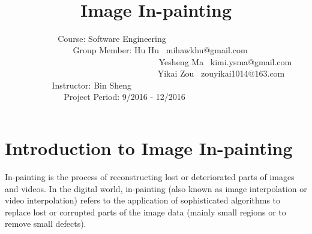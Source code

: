 \documentclass[12pt]{article}
\begin{document}
\title{\huge\textbf{\ \\ \ \\Image In-painting}\vspace{9cm}}
\author{	
	\large
	Course: Software Engineering\ \ \ \ \ \ \  \ \  \  \  \ \ \ \ \ \  \ \ \ \ \\
	\ \ \ \ \ \ \ \ \ \ \ Group Member: Hu Hu \ mihawkhu@gmail.com\ \ \ \ \ \ \ \ \ \\
	\ \ \ \ \ \ \ \ \  \ \ \ \ \ \ \ \ \ \ \ \ \ \ \ \ \ \ \ \ \ \ \ \ Yesheng Ma \ kimi.ysma@gmail.com \\
	\ \ \ \ \ \ \ \ \  \ \ \ \ \ \ \ \ \ \ \ \ \ \ \ \ \ \ \ \ \   \ Yikai Zou \ zouyikai1014@163.com\\
	Instructor: Bin Sheng \ \ \ \ \ \ \ \  \ \ \ \ \ \ \ \ \ \ \ \ \ \ \  \ \ \ \ \ \ \ \\
	Project Period: 9/2016 - 12/2016\ \ \ \ \  \ \ \ \ \ \ \ \ \ \ 	
	} \date{ }

\maketitle\thispagestyle{empty}
\newpage
\tableofcontents\thispagestyle{empty}
\newpage


\section{Introduction to Image In-painting}
In-painting is the process of reconstructing lost or deteriorated parts of images and videos. In the digital world, in-painting (also known as image interpolation or video interpolation) refers to the application of sophisticated algorithms to replace lost or corrupted parts of the image data (mainly small regions or to remove small defects).
\end{document}
